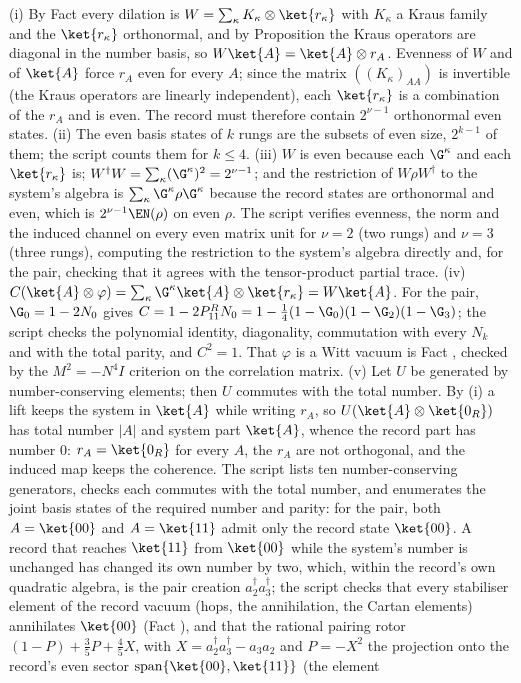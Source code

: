 (i) By Fact  every dilation is $W = \sum_{\kappa}K_{\kappa} \otimes \ket{r_{\kappa}}$ with $K_{\kappa}$ a Kraus family and the $\ket{r_{\kappa}}$ orthonormal, and by Proposition  the Kraus operators are diagonal in the number basis, so $W\ket{A} = \ket{A} \otimes r_{A}$. Evenness of $W$ and of $\ket{A}$ force $r_{A}$ even for every $A$; since the matrix $((K_{\kappa})_{AA})$ is invertible (the Kraus operators are linearly independent), each $\ket{r_{\kappa}}$ is a combination of the $r_{A}$ and is even. The record must therefore contain $2^{\nu-1}$ orthonormal even states. (ii) The even basis states of $k$ rungs are the subsets of even size, $2^{k-1}$ of them; the script counts them for $k \leq 4$. (iii) $W$ is even because each $\G^{\kappa}$ and each $\ket{r_{\kappa}}$ is; $W^{\dagger}W = \sum_{\kappa}(\G^{\kappa})^{2} = 2^{\nu-1}$; and the restriction of $W\rho W^{\dagger}$ to the system's algebra is $\sum_{\kappa}\G^{\kappa}\rho\G^{\kappa}$ because the record states are orthonormal and even, which is $2^{\nu-1}\EN(\rho)$ on even $\rho$. The script verifies evenness, the norm and the induced channel on every even matrix unit for $\nu = 2$ (two rungs) and $\nu = 3$ (three rungs), computing the restriction to the system's algebra directly and, for the pair, checking that it agrees with the tensor-product partial trace. (iv) $C(\ket{A} \otimes \varphi) = \sum_{\kappa}\G^{\kappa}\ket{A} \otimes \ket{r_{\kappa}} = W\ket{A}$. For the pair, $\G_{0} = 1 - 2N_{0}$ gives $C = 1 - 2P^{R}_{11}N_{0} = 1 - \tfrac14(1 - \G_{0})(1 - \G_{2})(1 - \G_{3})$; the script checks the polynomial identity, diagonality, commutation with every $N_{k}$ and with the total parity, and $C^{2} = 1$. That $\varphi$ is a Witt vacuum is Fact , checked by the $M^{2} = -N^{4}I$ criterion on the correlation matrix. (v) Let $U$ be generated by number-conserving elements; then $U$ commutes with the total number. By (i) a lift keeps the system in $\ket{A}$ while writing $r_{A}$, so $U(\ket{A} \otimes \ket{0_{R}})$ has total number $|A|$ and system part $\ket{A}$, whence the record part has number $0$: $r_{A} = \ket{0_{R}}$ for every $A$, the $r_{A}$ are not orthogonal, and the induced map keeps the coherence. The script lists ten number-conserving generators, checks each commutes with the total number, and enumerates the joint basis states of the required number and parity: for the pair, both $A = \ket{00}$ and $A = \ket{11}$ admit only the record state $\ket{00}$. A record that reaches $\ket{11}$ from $\ket{00}$ while the system's number is unchanged has changed its own number by two, which, within the record's own quadratic algebra, is the pair creation $a^{\dagger}_{2}a^{\dagger}_{3}$; the script checks that every stabiliser element of the record vacuum (hops, the annihilation, the Cartan elements) annihilates $\ket{00}$ (Fact ), and that the rational pairing rotor $(1 - P) + \tfrac35 P + \tfrac45 X$, with $X = a^{\dagger}_{2}a^{\dagger}_{3} - a_{3}a_{2}$ and $P = -X^{2}$ the projection onto the record's even sector $\operatorname{span}\{\ket{00}, \ket{11}\}$ (the element 